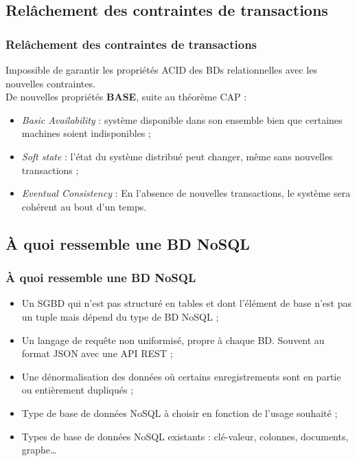 	\subsection{Relâchement des contraintes de transactions}
	\begin{frame}
		\frametitle{Relâchement des contraintes de transactions}

		Impossible de garantir les propriétés ACID des BDs relationnelles avec les nouvelles contraintes.\\
		\vspace{10px}
		De nouvelles propriétés \textbf{BASE}, suite au théorème CAP :
		\begin{itemize}
			\item \textit{Basic Availability} : système disponible dans son ensemble bien que certaines machines soient indisponibles ;
			\item \textit{Soft state} : l'état du système distribué peut changer, même sans nouvelles transactions ;
			\item \textit{Eventual Consistency} : En l'absence de nouvelles transactions, le système sera cohérent au bout d'un temps.
		\end{itemize}

	\end{frame}

	\subsection{À quoi ressemble une BD NoSQL}
	\begin{frame}
		\frametitle{À quoi ressemble une BD NoSQL}

		\begin{itemize}
			\item Un SGBD qui n'est pas structuré en tables et dont l'élément de base n'est pas un tuple mais dépend du type de BD NoSQL ;
			\item Un langage de requête non uniformisé, propre à chaque BD. Souvent au format JSON avec une API REST ;
			\item Une dénormalisation des données où certains enregistrements sont en partie ou entièrement dupliqués ;
			\item Type de base de données NoSQL à choisir en fonction de l'usage souhaité ;
			\item Types de base de données NoSQL existants : clé-valeur, colonnes, documents, graphe\dots
		\end{itemize}

	\end{frame}
